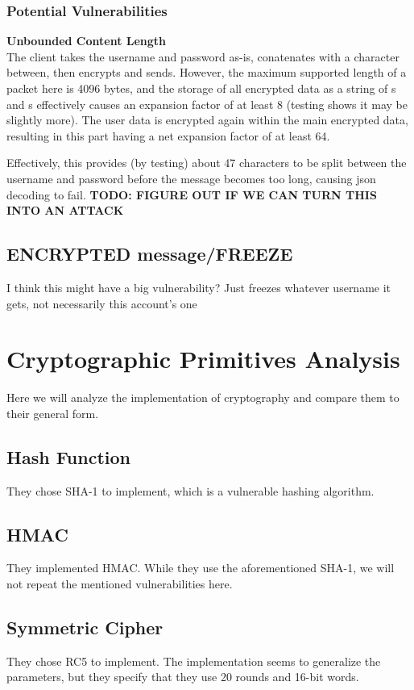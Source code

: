 \documentclass{article}
\newcommand{\code}[1]{\tcbox[
    on line,
    colback=codebackground, boxsep=2pt,
    colframe=white, boxrule=0pt,
    top=0pt, bottom=0pt, left=0pt, right=0pt
]{\texttt{#1}}}
\begin{document}
\subsubsection{Potential Vulnerabilities}
\textbf{Unbounded Content Length} \\
The client takes the username and password as-is, conatenates with a \code{/} character between, then encrypts and sends. However, the maximum supported length of a packet here is 4096 bytes, and the storage of all encrypted data as a string of \code{1}s and \code{0}s effectively causes an expansion factor of at least 8 (testing shows it may be slightly more). The user data is encrypted again within the main encrypted data, resulting in this part having a net expansion factor of at least 64.

Effectively, this provides (by testing) about 47 characters to be split between the username and password before the message becomes too long, causing json decoding to fail. \textbf{TODO: FIGURE OUT IF WE CAN TURN THIS INTO AN ATTACK}

\subsection{ENCRYPTED message/FREEZE}
I think this might have a big vulnerability? Just freezes whatever username it gets, not necessarily this account's one

\section{Cryptographic Primitives Analysis}
Here we will analyze the implementation of cryptography and compare them to their general form.
\subsection{Hash Function}
They chose SHA-1 to implement, which is a vulnerable hashing algorithm.

\subsection{HMAC}
They implemented HMAC. While they use the aforementioned SHA-1, we will not repeat the mentioned vulnerabilities here.

\subsection{Symmetric Cipher}
They chose RC5 to implement. The implementation seems to generalize the parameters, but they specify that they use 20 rounds and 16-bit words.
\end{document}
